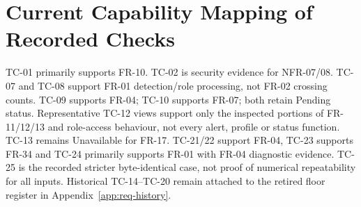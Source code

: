 \section{Current Capability Mapping of Recorded Checks}
TC-01 primarily supports FR-10. TC-02 is security evidence for NFR-07/08. TC-07 and TC-08 support FR-01 detection/role processing, not FR-02 crossing counts. TC-09 supports FR-04; TC-10 supports FR-07; both retain Pending status. Representative TC-12 views support only the inspected portions of FR-11/12/13 and role-access behaviour, not every alert, profile or status function. TC-13 remains Unavailable for FR-17. TC-21/22 support FR-04, TC-23 supports FR-34 and TC-24 primarily supports FR-01 with FR-04 diagnostic evidence. TC-25 is the recorded stricter byte-identical case, not proof of numerical repeatability for all inputs. Historical TC-14--TC-20 remain attached to the retired floor register in Appendix~\ref{app:req-history}.

